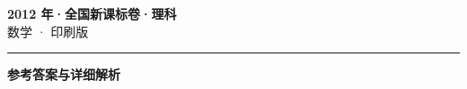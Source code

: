 \documentclass[zihao=5, a4paper]{ctexart}
\begin{document}
\begin{center}
  {\Large\bfseries 2012 年·全国新课标卷·理科}\\[4pt]
  {\large 数学 · 印刷版}
\end{center}
\medskip
{}

\par\bigskip\hrule\bigskip
{}
\begin{center}{\large\bfseries 参考答案与详细解析}\end{center}
\smallskip

\end{document}
